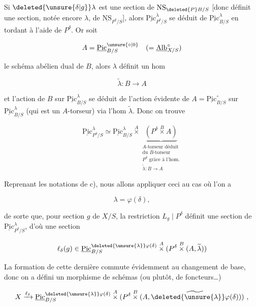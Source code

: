 Si $\deleted{\unsure{\delta|g}}\lambda$ est une section de $\mathrm{NS}_{\deleted{P}B/S}$ [donc définit une section, notée encore $\lambda$, de $\underline{\mathrm{NS}}_{P^\delta/S}$], alors $\underline{\mathrm{Pic}}^\lambda_{P^\delta/S}$ se déduit de $\underline{\mathrm{Pic}}^\lambda_{B/S}$ en tordant à l'aide de $P^\delta$. Or soit

\[
A=\underline{\mathrm{Pic}}^{\unsure{\circ|0}}_{B/S}\quad(=\underline{\mathrm{Alb}}^\circ_{X/S})
\]

le schéma abélien dual de $B$,  alors $\lambda$ définit un hom

\[
\widetilde\lambda:B\longrightarrow A
\]

et l'action de $B$ sur $\underline{\mathrm{Pic}}^\lambda_{B/S}$ se déduit de l'action évidente de $A=\underline{\mathrm{Pic}}^\circ_{B/S}$ sur $\underline{\mathrm{Pic}}^\lambda_{B/S}$ (qui est un $A$-torseur) via l'hom $\widetilde\lambda$. Donc on trouve

\[
\underline{\mathrm{Pic}}^\lambda_{P^\delta/S}\simeq\underline{\mathrm{Pic}}^\lambda_{B/S}
\overset{A}{\times}
\underbrace{\left(P^\delta\overset{B}{\times} A\right)}_{
\substack{A\text{-torseur déduit}\\\text{du }B\text{-torseur}\\ P^\delta\text{ grâce à l'hom.}\\ \widetilde\lambda:B\to A}}
\]

 Reprenant les notations de c), nous allons appliquer ceci au cas où l'on a

\[
\lambda=\varphi(\delta),
\]

de sorte que, pour  section $g$ de $X/S$, la restriction $L_g\mid P^\delta$ définit une section de $\underline{\mathrm{Pic}}^\lambda_{P^\delta/S}$, d'où une section

\[
\ell_\delta(g)\in\underline{\mathrm{Pic}}^{\deleted{\unsure{\lambda}}\varphi(\delta)}_{B/S}
\overset{A}{\times}(P^\delta\overset{B}{\times}(A,\widetilde\lambda))
\]

La formation de cette dernière commute évidemment au changement de base, donc on a défini un morphisme de schémas (ou plutôt, de foncteurs\ldots)

\[
X\xrightarrow{\ell_\delta}\underline{\mathrm{Pic}}_{B/S}^{\deleted{\unsure{\lambda}}\varphi(\delta)}
\overset{A}{\times}(P^\delta\overset{B}{\times}(A,\widetilde{\deleted{\unsure{\lambda}}\varphi(\delta)}))\ , 
\]

